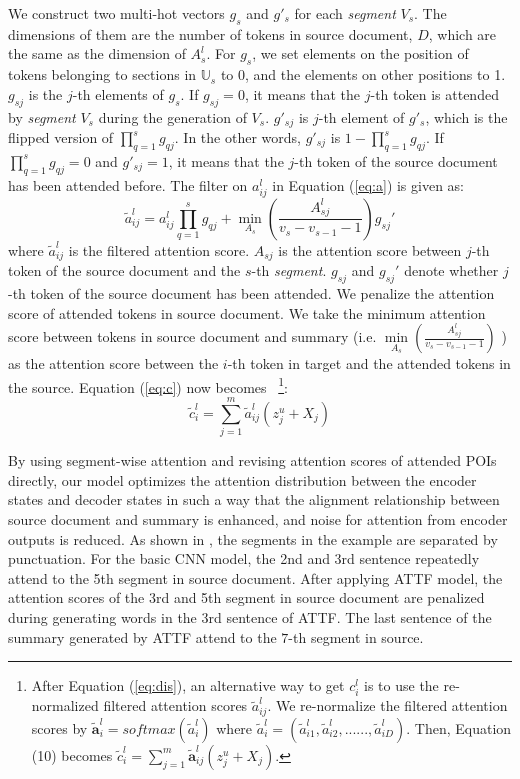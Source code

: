 We construct two multi-hot vectors $g_{s}$ and $g'_{s}$ for each \textit{segment} $V_{s}$.
The dimensions of them are the number of tokens in source document, $D$, 
which are the same as the dimension of $A_{s}^{l}$. 
For $g_{s}$, we set elements on the position of tokens
belonging to sections in $\mathbb{U}_{s}$ to 0, and the elements on other
positions to 1. 
$g_{sj}$ is the $j$-th elements of $g_s$.
If $g_{sj}=0$, it means that the $j$-th token is attended by {\em segment} $V_s$ during the generation of $V_s$.
$g'_{sj}$ is $j$-th element of $g'_{s}$, which is the flipped version of $\prod \limits_{q=1}^{s}g_{qj}$. 
In the other words, $g'_{sj}$ is $1-\prod \limits_{q=1}^{s}g_{qj}$.
If $\prod \limits_{q=1}^{s}g_{qj}=0$ and $g'_{sj}=1$, it means that the $j$-th token of the source document has been attended before.
The filter on $a_{ij}^{l}$ in Equation (\ref{eq:a}) is given as:
\begin{equation} \label{eq:dis}
	\tilde{a}_{ij}^{l} = a_{ij}^{l}\prod_{q=1}^{s}g_{qj} + \min \limits_{A_{s}}\left(\frac{A_{sj}^{l}}{v_{s}-v_{s-1}-1}\right)g_{sj}'
\end{equation}
where 
$\tilde{a}_{ij}^l$ is the filtered attention score. 
$A_{sj}$ is the attention score between $j$-th token
of the source document and the $s$-th \textit{segment}. 
$g_{sj}$ and $g_{sj}'$ denote whether $j$-th token
of the source document has been attended.
We penalize the attention score of attended tokens in source document.
We take the minimum attention score between tokens in source document and summary 
(i.e. $\min \limits_{A_{s}}\left(\frac{A_{sj}^{l}}{v_{s}-v_{s-1}-1}\right)$ )
as the attention score between the $i$-th token in target 
and the attended tokens in the source.
Equation (\ref{eq:c}) now becomes
~\footnote{After Equation (\ref{eq:dis}), 
	an alternative way to get $c^l_i$ is to use the re-normalized filtered attention scores $\tilde{a}_{ij}^l$. We re-normalize the filtered attention scores by $\tilde{\textbf{a}}_i^l=softmax(\tilde{a}_{i}^l)$ where $\tilde{a}_{i}^l=(\tilde{a}_{i1}^l, \tilde{a}_{i2}^l,......,\tilde{a}_{iD}^l)$. 
	Then, Equation (10) becomes 
	$\tilde{c} _ { i } ^ { l } = \sum _ { j = 1 } ^ { m } \tilde{\textbf{a}}_{ij}^{l} \left( z _ { j } ^ { u } + X_j \right)$.}:
\begin{equation} 
	\label{eq: ccc}
    \tilde{c} _ { i } ^ { l } = \sum _ { j = 1 } ^ { m } \tilde{a}_{ij}^{l} \left( z _ { j } ^ { u } + X_j \right)
\end{equation}


By using segment-wise attention and revising attention scores of attended POIs directly,
our model optimizes the
attention distribution between the encoder states and decoder states in such a way that
the alignment relationship between source document and summary is enhanced, 
and noise for attention from encoder outputs is reduced. 
As shown in , the segments in the example are separated by punctuation.
For the basic CNN model, the 2nd and 3rd sentence repeatedly attend to 
the 5th segment in source document.
After applying ATTF model, 
the attention scores of the 3rd and 5th segment in source document are penalized 
during generating words in the 3rd sentence of ATTF.
The last sentence of the summary generated by ATTF attend to the $7$-th segment in source.

